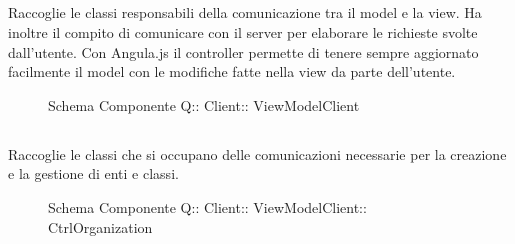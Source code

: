 \subsection{}
Raccoglie le classi responsabili della comunicazione tra il model e la view. Ha inoltre il compito di comunicare con il server per elaborare le richieste svolte dall'utente.
Con Angula.js il controller permette di tenere sempre aggiornato facilmente il model con le modifiche fatte nella view da parte dell'utente.
\begin{figure}[H]
\centering
\noindent{}
\caption[Schema Componente Quizzipedia::Client::ViewModelClient]{Schema Componente Q:: Client:: ViewModelClient}
\end{figure}
\subsection{}
Raccoglie le classi che si occupano delle comunicazioni necessarie per la creazione e la gestione di enti e classi.
\begin{figure}[H]
\centering
\noindent{}
\caption[Schema Componente Quizzipedia::Client::ViewModelClient::CtrlOrganization]{Schema Componente Q:: Client:: ViewModelClient:: CtrlOrganization}
\end{figure}
